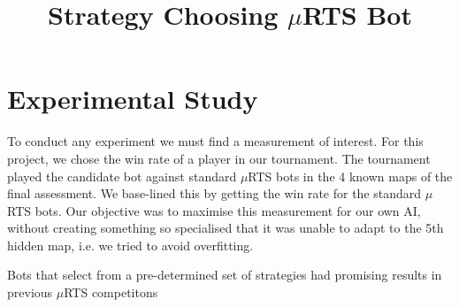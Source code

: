 \documentclass[]{article}
\title{Strategy Choosing $\mu$RTS Bot}
\author{}
\begin{document}
\maketitle

\begin{abstract}

\end{abstract}

\section{Experimental Study}
To conduct any experiment we must find a measurement of interest. For this project, we chose the win rate of a player in our tournament. The tournament played the candidate bot against standard $\mu$RTS bots in the 4 known maps of the final assessment. We base-lined this by getting the win rate for the standard $\mu$RTS bots. Our objective was to maximise this measurement for our own AI, without creating something so specialised that it was unable to adapt to the 5th hidden map, i.e. we tried to avoid overfitting. 

Bots that select from a pre-determined set of strategies had promising results in previous $\mu$RTS competitons \cite{firstcomp}



\end{document}
